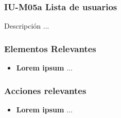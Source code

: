 
\subsubsection{IU-M05a Lista de usuarios}

 Descripción ...


\subsubsection{Elementos Relevantes}

    \begin{itemize}
    \item {\bf Lorem ipsum}
        ...
    \end{itemize}

\subsubsection{Acciones relevantes}

    \begin{itemize}
    \item {\bf Lorem ipsum}
        ...
    \end{itemize}

\clearpage
